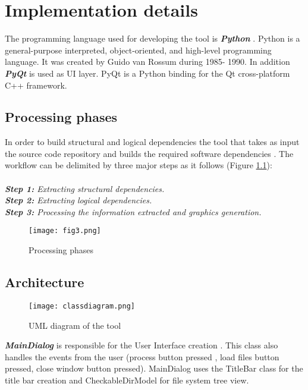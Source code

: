 \chapter{Implementation details}
The programming language used for developing the tool is \textit{\textbf{Python}} . Python is a general-purpose interpreted, object-oriented, and high-level programming language. It was created by Guido van Rossum during 1985- 1990. \cite{python}
In addition \textit{\textbf{PyQt}} is used as UI layer. PyQt is a Python binding for the Qt cross-platform C++ framework. 

\section{Processing phases}
\tab In order to build structural and logical dependencies the tool that takes as input the source code repository and builds the required software dependencies . The workﬂow can be delimited by three major steps as it follows  (Figure \ref{fig:fig3}):  \\\\
\textit{\textbf{Step 1:} Extracting structural dependencies.}\\
\textit{\textbf{Step 2:} Extracting logical dependencies.}\\
\textit{\textbf{Step 3:} Processing the information extracted and graphics generation.}

\begin{figure}[h]
\centering
\texttt{[image: fig3.png]}
\caption{Processing phases}
\label{fig:fig3}
\end{figure}


\section{Architecture}

\begin{figure}[h]
\centering
\texttt{[image: classdiagram.png]}
\caption{UML diagram of the tool}
\label{fig:figdiagram}
\end{figure}

 \textit{\textbf{MainDialog}} is responsible for the User Interface creation . This class also handles the events from the user (process button pressed , load files button pressed, close window button pressed). MainDialog uses the TitleBar class for the title bar creation and CheckableDirModel for file system tree view. \\

